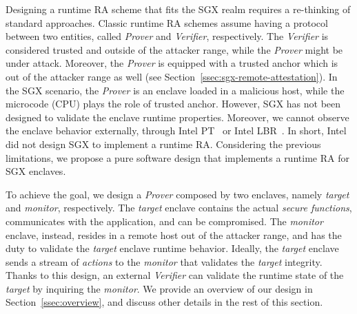 Designing a runtime RA scheme that fits the SGX realm requires a re-thinking of 
standard approaches.
Classic runtime RA schemes assume having a protocol between two entities, 
called \emph{Prover} and \emph{Verifier}, respectively.
The \emph{Verifier} is considered trusted and outside of the attacker range, 
while the \emph{Prover} might be under attack. Moreover, the \emph{Prover} is 
equipped with a trusted anchor which is out of the 
attacker range as well (see Section~\ref{ssec:sgx-remote-attestation}).
In the SGX scenario, the \emph{Prover} is an enclave loaded in a 
malicious host, while the microcode (\ie CPU) plays the role of trusted anchor.
However, SGX has not been designed to validate the enclave runtime
properties. Moreover, we cannot observe the enclave behavior externally, \eg 
through Intel PT~\citep{kleen2015intel} or Intel 
LBR~\citep{7924286,9051250}.
In short, Intel did not design SGX to implement a runtime RA.
Considering the previous limitations, we propose a pure software design that 
implements a runtime RA for SGX enclaves.

To achieve the goal, we design a \emph{Prover} composed by two 
enclaves, namely \emph{target} and \emph{monitor}, respectively.
The \emph{target} enclave contains the actual \emph{secure functions}, 
communicates with the application, and can be compromised.
The \emph{monitor} enclave, instead, resides in a remote host out 
of the attacker range, and has the duty to validate the \emph{target} enclave 
runtime behavior.
Ideally, the \emph{target} enclave sends a stream of \emph{actions} to 
the \emph{monitor} that validates the \emph{target} integrity.
Thanks to this design, an external \emph{Verifier} can validate the runtime 
state of the \emph{target} by inquiring the \emph{monitor}.
We provide an overview of our design in Section~\ref{ssec:overview}, and 
discuss other details in the rest of this section.

